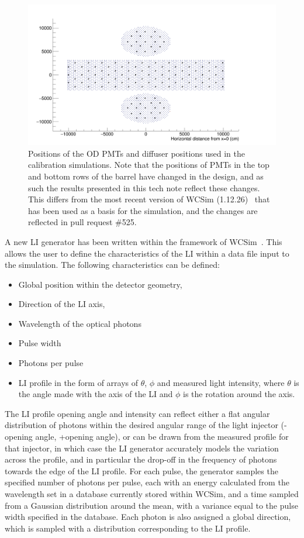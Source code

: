 \documentclass[a4paper,11pt]{article}
\begin{document}
\begin{figure}
    \centering
    \includegraphics[width=0.95\linewidth]{diffuser_PMT_positions.png}
    \caption{Positions of the OD PMTs and diffuser positions used in the calibration simulations. Note that the positions of PMTs in the top and bottom rows of the barrel have changed in the design, and as such the results presented in this tech note reflect these changes. This differs from the most recent version of WCSim (1.12.26)~\cite{WCSim} that has been used as a basis for the simulation, and the changes are reflected in pull request \#525.}
    \label{fig:diffuserPositions}
\end{figure}

A new LI generator has been written within the framework of WCSim~\cite{WCSim}. This allows the user to define the characteristics of the LI within a data file input to the simulation. The following characteristics can be defined:
\begin{itemize}
    \item Global position within the detector geometry,
    \item Direction of the LI axis,
    \item Wavelength of the optical photons
    \item Pulse width
    \item Photons per pulse
    \item LI profile in the form of arrays of $\theta$, $\phi$ and measured light intensity, where $\theta$ is the angle made with the axis of the LI and $\phi$ is the rotation around the axis.
\end{itemize}

The LI profile opening angle and intensity can reflect either a flat angular distribution of photons within the desired angular range of the light injector (-opening angle, +opening angle), or can be drawn from the measured profile for that injector, in which case the LI generator accurately models the variation across the profile, and in particular the drop-off in the frequency of photons towards the edge of the LI profile. For each pulse, the generator samples the specified number of photons per pulse, each with an energy calculated from the wavelength set in a database currently stored within WCSim, and a time sampled from a Gaussian distribution around the mean, with a variance equal to the pulse width specified in the database. Each photon is also assigned a global direction, which is sampled with a distribution corresponding to the LI profile.
\end{document}
